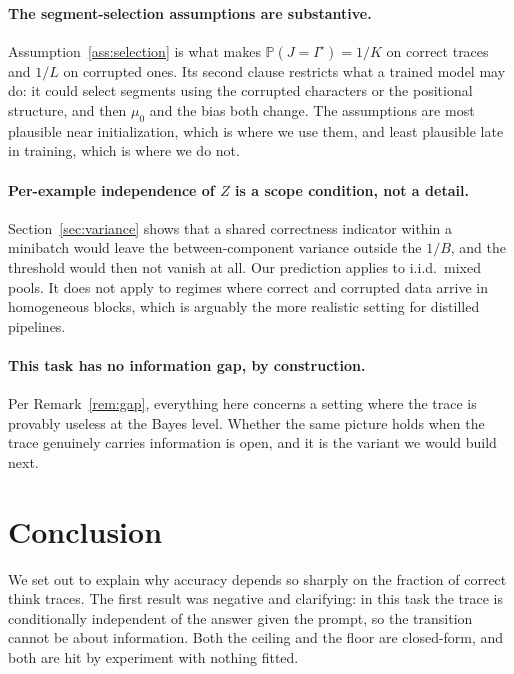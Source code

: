 \documentclass{article}
\theoremstyle{plain}
\theoremstyle{definition}
\theoremstyle{remark}
\newcommand{\Prob}{\mathbb{P}}
\newcommand{\1}{\mathbf{1}}
\begin{document}
\paragraph{The segment-selection assumptions are substantive.}
Assumption~\ref{ass:selection} is what makes $\Prob(J=I^\star) = 1/K$ on correct
traces and $1/L$ on corrupted ones. Its second clause restricts what a trained
model may do: it could select segments using the corrupted characters or the
positional structure, and then $\mu_0$ and the bias both change. The assumptions
are most plausible near initialization, which is where we use them, and least
plausible late in training, which is where we do not.

\paragraph{Per-example independence of $Z$ is a scope condition, not a detail.}
Section~\ref{sec:variance} shows that a shared correctness indicator within a
minibatch would leave the between-component variance outside the $1/B$, and the
threshold would then not vanish at all. Our prediction applies to i.i.d.\ mixed
pools. It does not apply to regimes where correct and corrupted data arrive in
homogeneous blocks, which is arguably the more realistic setting for distilled
pipelines.

\paragraph{This task has no information gap, by construction.}
Per Remark~\ref{rem:gap}, everything here concerns a setting where the trace is
provably useless at the Bayes level. Whether the same picture holds when the
trace genuinely carries information is open, and it is the variant we would build
next.

\section{Conclusion}
\label{sec:conclusion}

We set out to explain why accuracy depends so sharply on the fraction of correct
think traces. The first result was negative and clarifying: in this task the
trace is conditionally independent of the answer given the prompt, so the
transition cannot be about information. Both the ceiling and the floor are
closed-form, and both are hit by experiment with nothing fitted.
\end{document}
